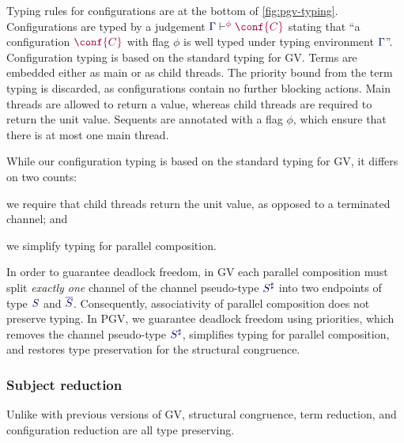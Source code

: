 \documentclass[main.tex]{subfiles}
\begin{document}
Typing rules for configurations are at the bottom of \cref{fig:pgv-typing}. Configurations are typed by a judgement $\cseq[\phi]{\ty{\Gamma}}{\conf{C}}$ stating that ``a configuration $\tm{\conf{C}}$ with flag $\phi$ is well typed under typing environment $\ty{\Gamma}$''. Configuration typing is based on the standard typing for GV. Terms are embedded either as main or as child threads. The priority bound from the term typing is discarded, as configurations contain no further blocking actions. Main threads are allowed to return a value, whereas child threads are required to return the unit value. Sequents are annotated with a flag $\phi$, which ensure that there is at most one main thread.

While our configuration typing is based on the standard typing for GV, it differs on two counts:
\begin{enumerate*}[label=(\roman*)]
\item we require that child threads return the unit value, as opposed to a terminated channel; and
\item we simplify typing for parallel composition.
\end{enumerate*}
In order to guarantee deadlock freedom, in GV each parallel composition must split \emph{exactly one} channel of the channel pseudo-type $\ty{S^\sharp}$ into two endpoints of type $\ty{S}$ and $\ty{\co{S}}$. Consequently, associativity of parallel composition does not preserve typing. In PGV, we guarantee deadlock freedom using priorities, which removes the channel pseudo-type $\ty{S^\sharp}$, simplifies typing for parallel composition, and restores type preservation for the structural congruence.


\subsubsection*{Subject reduction}
Unlike with previous versions of GV, structural congruence, term reduction, and configuration reduction are all type preserving.
\end{document}
